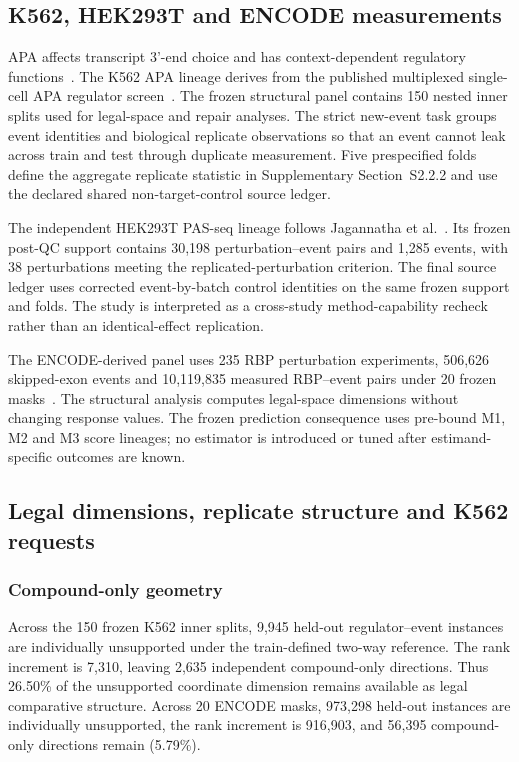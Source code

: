 \documentclass[11pt]{article}
\begin{document}
\subsection{K562, HEK293T and ENCODE measurements}
APA affects transcript 3'-end choice and has context-dependent regulatory functions~\cite{tian2017apa,gruber2019apa,mitschka2022apa}. The K562 APA lineage derives from the published multiplexed single-cell APA regulator screen~\cite{kowalski2024cpa}. The frozen structural panel contains 150 nested inner splits used for legal-space and repair analyses. The strict new-event task groups event identities and biological replicate observations so that an event cannot leak across train and test through duplicate measurement. Five prespecified folds define the aggregate replicate statistic in Supplementary Section~S2.2.2 and use the declared shared non-target-control source ledger.

The independent HEK293T PAS-seq lineage follows Jagannatha et al.~\cite{jagannatha2026rbp}. Its frozen post-QC support contains 30,198 perturbation--event pairs and 1,285 events, with 38 perturbations meeting the replicated-perturbation criterion. The final source ledger uses corrected event-by-batch control identities on the same frozen support and folds. The study is interpreted as a cross-study method-capability recheck rather than an identical-effect replication.

The ENCODE-derived panel uses 235 RBP perturbation experiments, 506,626 skipped-exon events and 10,119,835 measured RBP--event pairs under 20 frozen masks~\cite{vannostrand2020rbp,shen2014rmats}. The structural analysis computes legal-space dimensions without changing response values. The frozen prediction consequence uses pre-bound M1, M2 and M3 score lineages; no estimator is introduced or tuned after estimand-specific outcomes are known.


\subsection{Legal dimensions, replicate structure and K562 requests}
\subsubsection{Compound-only geometry}
Across the 150 frozen K562 inner splits, 9,945 held-out regulator--event instances are individually unsupported under the train-defined two-way reference. The rank increment is 7,310, leaving 2,635 independent compound-only directions. Thus 26.50\% of the unsupported coordinate dimension remains available as legal comparative structure. Across 20 ENCODE masks, 973,298 held-out instances are individually unsupported, the rank increment is 916,903, and 56,395 compound-only directions remain (5.79\%).
\end{document}
